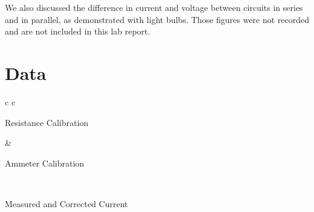 \documentclass[12pt,letterpaper,titlepage]{report}
\begin{document}
\medskip
We also discussed the difference in current and voltage between circuits in series and in parallel, as demonstrated with light bulbs. Those figures were not recorded and are not included in this lab report.




\pagebreak
\section*{Data}

\bigskip
\bigskip

\begin{minipage}{\textwidth}
    \centering
    \begin{tabular}[t]{c c}
        
        \begin{minipage}{.4\textwidth}
            \centering
            \bigskip
            Resistance Calibration \\
            \bigskip
            
            \bigskip
            \bigskip %
            \bigskip %
            \bigskip
            \medskip %
        \end{minipage} &
        
        \begin{minipage}{.4\textwidth}
            \centering
            \bigskip
            Ammeter Calibration \\
            \bigskip
            
            \bigskip
            \bigskip
        \end{minipage} \\
        
         {
            \begin{minipage}{.4\textwidth}
                \centering
                \bigskip
                \bigskip
                Measured and Corrected Current \\
                \bigskip
                
                \bigskip
            \end{minipage}
        }
                
    \end{tabular}
\end{minipage}
\end{document}
